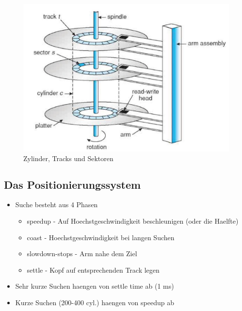 \documentclass[a4paper]{scrreprt}
\begin{document}
\begin{figure}[ht]
\centering
\includegraphics[scale=0.3]{harddisk.png}
\caption{Zylinder, Tracks und Sektoren}
\end{figure}
\subsection{Das Positionierungssystem}
\begin{itemize}
	\item Suche besteht aus 4 Phasen
		\begin{itemize}
			\item speedup - Auf Hoechstgeschwindigkeit beschleunigen (oder die Haelfte)
			\item coast - Hoechstgeschwindigkeit bei langen Suchen
			\item slowdown-stops - Arm nahe dem Ziel
			\item settle - Kopf auf entsprechenden Track legen
		\end{itemize}
	\item Sehr kurze Suchen haengen von settle time ab (1 ms)
	\item Kurze Suchen (200-400 cyl.) haengen von speedup ab
\end{itemize}
\end{document}
